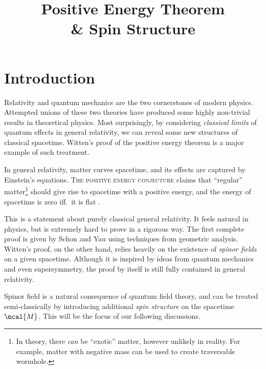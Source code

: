 \documentclass[a4paper,11pt]{article}
\title{Positive Energy Theorem\\[.5ex]
		\& Spin Structure
	}
\author{
		{\signature Bryan}, %
		\sf%
		X.~J.~Xie, %
		H.~Q.~Wu
	}
\date{}
\begin{document}
\maketitle
{}
\pagestyle{headings}
\thispagestyle{empty}

\vspace{.2\baselineskip}

\setlength{\parskip}{.1\baselineskip}
\tableofcontents
\setlength{\parskip}{\parskipnorm}

\vspace{1\baselineskip}

\section{Introduction}
	Relativity and quantum mechanics are the two cornerstones of modern physics. Attempted unions of these two theories have produced some highly non-trivial results in theoretical physics. Most surprisingly, by considering \textit{classical limits} of quantum effects in general relativity, we can reveal some new structures of classical spacetime. 
	Witten's proof of the positive energy theorem \cite{Witten:1981mf} is a major example of such treatment. 
	
	In general relativity, matter curves spacetime, and its effects are captured by Einstein's equations. \textsc{The positive energy conjecture} claims that ``regular'' matter\footnote{
		In theory, there \textit{can} be ``exotic'' matter, however unlikely in reality. For example, matter with negative mass can be used to create traversable wormhole. 
	} should give rise to spacetime with a positive energy, and the energy of spacetime is zero iff.~it is flat \cite{Straumann:2013spu}. 
	
	This is a statement about purely classical general relativity. It feels natural in physics, but is extremely hard to prove in a rigorous way. The first complete proof is given by Schon and Yau \cite{Schon:1979rg} using techniques from geometric analysis. Witten's proof, on the other hand, relies heavily on the existence of \textit{spinor fields} on a given spacetime. Although it is inspired by ideas from quantum mechanics and even supersymmetry, the proof by itself is still fully contained in general relativity. 
	
	Spinor field is a natural consequence of quantum field theory, and can be treated {semi-classically} by introducing additional \textit{spin structure} on the spacetime $\mcal{M}$. This will be the focus of our following discussions. 
	
\end{document}
